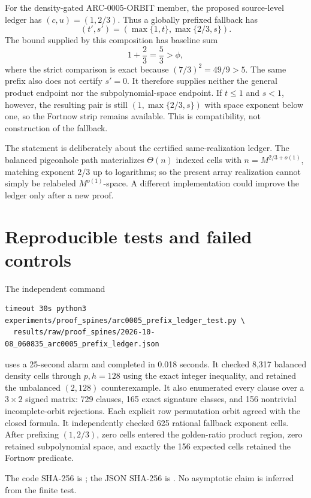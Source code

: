 \documentclass[11pt]{article}
\begin{document}
For the density-gated ARC-0005-ORBIT member, the proposed source-level ledger
has $(c,u)=(1,2/3)$.
Thus a globally prefixed fallback has
\[
 (t',s')=(\max\{1,t\},\max\{2/3,s\}).
\]
The bound supplied by this composition has baseline sum
\[
 1+\frac23=\frac53>\phi,
\]
where the strict comparison is exact because
$(7/3)^2=49/9>5$.  The same prefix also does not certify $s'=0$.
It therefore supplies neither the general product endpoint nor the
subpolynomial-space endpoint.  If $t\le1$ and $s<1$, however, the resulting
pair is still $(1,\max\{2/3,s\})$ with space exponent below one, so the
Fortnow strip remains available.  This is compatibility, not construction of
the fallback.

The statement is deliberately about the certified same-realization ledger.
The balanced pigeonhole path materializes $\Theta(n)$ indexed cells with
$n=M^{2/3+o(1)}$, matching exponent $2/3$ up to logarithms;
so the present array realization cannot simply be relabeled
$M^{o(1)}$-space.  A different implementation could improve the ledger only
after a new proof.

\section{Reproducible tests and failed controls}
The independent command
\begin{verbatim}
timeout 30s python3 experiments/proof_spines/arc0005_prefix_ledger_test.py \
  results/raw/proof_spines/2026-10-08_060835_arc0005_prefix_ledger.json
\end{verbatim}
uses a 25-second alarm and completed in 0.018 seconds.  It checked 8,317
balanced density cells through $p,h=128$ using the exact integer inequality,
and retained the unbalanced $(2,128)$ counterexample.  It also enumerated every
clause over a $3\times2$ signed matrix: 729 clauses, 165 exact signature
classes, and 156 nontrivial incomplete-orbit rejections.  Each explicit row
permutation orbit agreed with the closed formula.  It independently checked
625 rational fallback exponent cells.  After prefixing $(1,2/3)$, zero cells
entered the golden-ratio product region, zero retained subpolynomial space,
and exactly the 156 expected cells retained the Fortnow predicate.

The code SHA-256 is
;
the JSON SHA-256 is
.
No asymptotic claim is inferred from the finite test.
\end{document}

